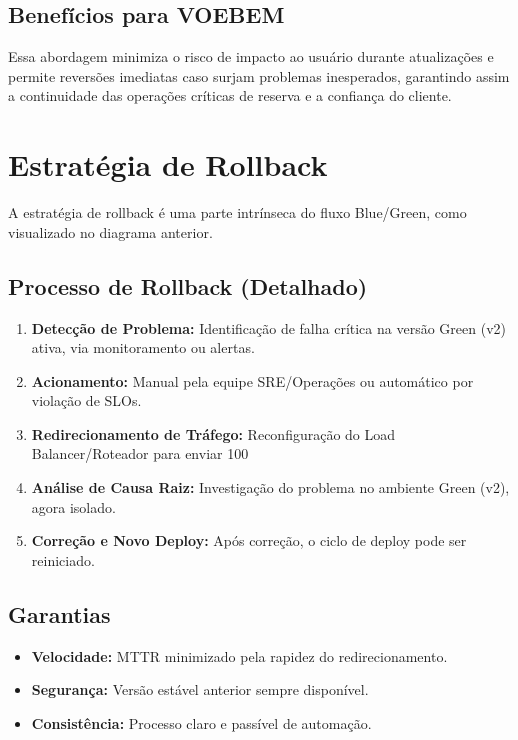 \subsection{Benefícios para VOEBEM}
\label{subsec:deploy-beneficios}
Essa abordagem minimiza o risco de impacto ao usuário durante atualizações e permite reversões imediatas caso surjam problemas inesperados, garantindo assim a continuidade das operações críticas de reserva e a confiança do cliente.

\section{Estratégia de Rollback}
\label{sec:estrategia-rollback}

A estratégia de rollback é uma parte intrínseca do fluxo Blue/Green, como visualizado no diagrama anterior.

\subsection{Processo de Rollback (Detalhado)}
\label{subsec:rollback-processo}
\begin{enumerate}
    \item \textbf{Detecção de Problema:} Identificação de falha crítica na versão Green (v2) ativa, via monitoramento ou alertas.
    \item \textbf{Acionamento:} Manual pela equipe SRE/Operações ou automático por violação de SLOs.
    \item \textbf{Redirecionamento de Tráfego:} Reconfiguração do Load Balancer/Roteador para enviar 100%
    \item \textbf{Análise de Causa Raiz:} Investigação do problema no ambiente Green (v2), agora isolado.
    \item \textbf{Correção e Novo Deploy:} Após correção, o ciclo de deploy pode ser reiniciado.
\end{enumerate}

\subsection{Garantias}
\label{subsec:rollback-garantias}
\begin{itemize}
    \item \textbf{Velocidade:} MTTR minimizado pela rapidez do redirecionamento.
    \item \textbf{Segurança:} Versão estável anterior sempre disponível.
    \item \textbf{Consistência:} Processo claro e passível de automação.
\end{itemize}

